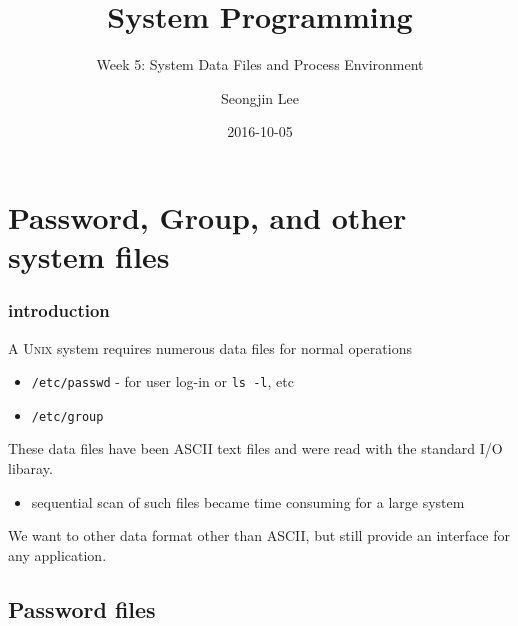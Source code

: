 \documentclass[newPxFont,sthlmFooter,nooffset]{beamer}
\title{System Programming}
\subtitle{Week 5: System Data Files and Process Environment}
\author[SJL]{Seongjin Lee}
\institute{\href{mailto:insight@hanyang.ac.kr}{insight@hanyang.ac.kr}\\\url{http://esos.hanyang.ac.kr}\\Esos Lab. Hanyang University}
\date{2016-10-05}
\begin{document}
\frame[plain]{\titlepage} 




\section{Password, Group, and other system files}

\begin{frame}[t]
  \frametitle{introduction}
A \textsc{Unix} system requires numerous data files for normal operations
\begin{itemize}
\item \texttt{/etc/passwd} - for user log-in or \texttt{ls -l}, etc
\item \texttt{/etc/group} 
\end{itemize}

These data files have been ASCII text files and were read with the standard I/O libaray.

\begin{itemize}
\item sequential scan of such files became time consuming for a large system
\end{itemize}


We want to other data format other than ASCII, but still provide an interface for any application.

\end{frame}




\subsection{Password files}
\end{document}
